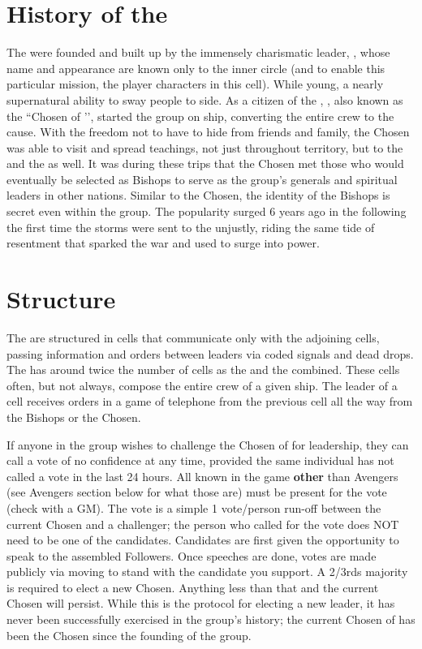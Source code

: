 \documentclass[blue]{GL2020}
\begin{document}
\section*{History of the \pGoaties{}}
The \pGoaties{} were founded and built up by the immensely charismatic leader, \cChupLeader{\full}, whose name and appearance are known only to the inner circle (and to enable this particular mission, the player characters in this cell). While young, \cChupLeader{\they} \cChupLeader{\have} a nearly supernatural ability to sway people to \cChupLeader{\their} side. As a citizen of the \pShip{}, \cChupLeader{}, also known as the ``Chosen of \cGenesis{}’’, started the group on \cChupLeader{\their} ship, converting the entire crew to the cause. With the freedom not to have to hide from friends and family, the Chosen was able to visit and spread \cChupLeader{\their} teachings, not just throughout \pShippie{} territory, but to the \pTech{} and the \pFarm{} as well. It was during these trips that the Chosen met those who would eventually be selected as Bishops to serve as the group's generals and spiritual leaders in other nations. Similar to the Chosen, the identity of the Bishops is secret even within the group. The \pGoaties{} popularity surged 6 years ago in the \pShip{} following the first time the storms were sent to the \pShip{} unjustly, riding the same tide of resentment that sparked the war and \cLoud{\full} used to surge into power.

\section*{Structure}
The \pGoaties{} are structured in cells that communicate only with the adjoining cells, passing information and orders between leaders via coded signals and dead drops. The \pShip{} has around twice the number of cells as the \pTech{} and the \pFarm{} combined. These cells often, but not always, compose the entire crew of a given ship. The leader of a cell receives orders in a game of telephone from the previous cell all the way from the Bishops or the Chosen.

If anyone in the group wishes to challenge the Chosen of \cGenesis{} for leadership, they can call a vote of no confidence at any time, provided the same individual has not called a vote in the last 24 hours. All known \pGoaties{} in the game \textbf{other} than Avengers (see Avengers section below for what those are) must be present for the vote (check with a GM). The vote is a simple 1 vote/person run-off between the current Chosen and a challenger; the person who called for the vote does NOT need to be one of the candidates. Candidates are first given the opportunity to speak to the assembled Followers. Once speeches are done, votes are made publicly via moving to stand with the candidate you support. A 2/3rds majority is required to elect a new Chosen. Anything less than that and the current Chosen will persist. While this is the protocol for electing a new leader, it has never been successfully exercised in the group's history; the current Chosen of \cGenesis{} has been the Chosen since the founding of the group. 
\end{document}
